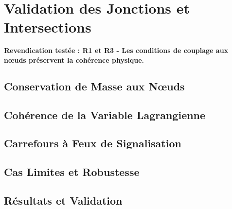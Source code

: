 \section{Validation des Jonctions et Intersections}
\label{sec:validation_jonctions}

\textbf{Revendication testée : R1 et R3 - Les conditions de couplage aux nœuds préservent la cohérence physique.}

\subsection{Conservation de Masse aux Nœuds}
\label{subsec:conservation_masse_noeuds}

\subsection{Cohérence de la Variable Lagrangienne}
\label{subsec:coherence_variable_w}

\subsection{Carrefours à Feux de Signalisation}
\label{subsec:carrefours_feux}

\subsection{Cas Limites et Robustesse}
\label{subsec:cas_limites_jonctions}

\subsection{Résultats et Validation}
\label{subsec:resultats_jonctions}

